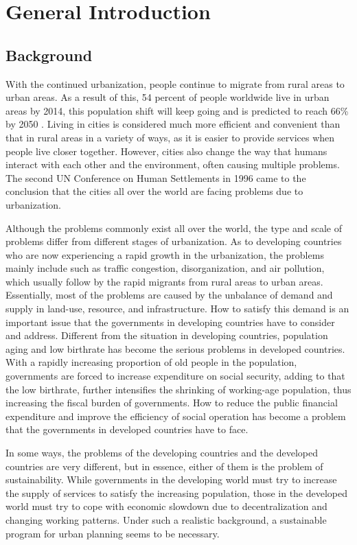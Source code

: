 \chapter{General Introduction}

%
\section{Background}
With the continued urbanization, people continue to migrate from rural areas to urban areas. As a result of this, 54 percent of people worldwide live in urban areas by 2014, this population shift will keep going and is predicted to reach 66\% by 2050 \cite{UN2014world}. Living in cities is considered much more efficient and convenient than that in rural areas in a variety of ways, as it is easier to provide services when people live closer together. However, cities also change the way that humans interact with each other and the environment, often causing multiple problems. The second UN Conference on Human Settlements in 1996 came to the conclusion that the cities all over the world are facing problems due to urbanization.

Although the problems commonly exist all over the world, the type and scale of problems differ from different stages of urbanization. As to developing countries who are now experiencing a rapid growth in the urbanization, the problems mainly include such as traffic congestion, disorganization, and air pollution, which usually follow by the rapid migrants from rural areas to urban areas. Essentially, most of the problems are caused by the unbalance of demand and supply in land-use, resource, and infrastructure. How to satisfy this demand is an important issue that the governments in developing countries have to consider and address. Different from the situation in developing countries, population aging and low birthrate has become the serious problems in developed countries. With a rapidly increasing proportion of old people in the population, governments are forced to increase expenditure on social security, adding to that the low birthrate, further intensifies the shrinking of working-age population, thus increasing the fiscal burden of governments. How to reduce the public financial expenditure and improve the efficiency of social operation has become a problem that the governments in developed countries have to face. 

In some ways, the problems of the developing countries and the developed countries are very different, but in essence, either of them is the problem of sustainability. While governments in the developing world must try to increase the supply of services to satisfy the increasing population, those in the developed world must try to cope with economic slowdown due to decentralization and changing working patterns. Under such a realistic background, a sustainable program for urban planning seems to be necessary.

